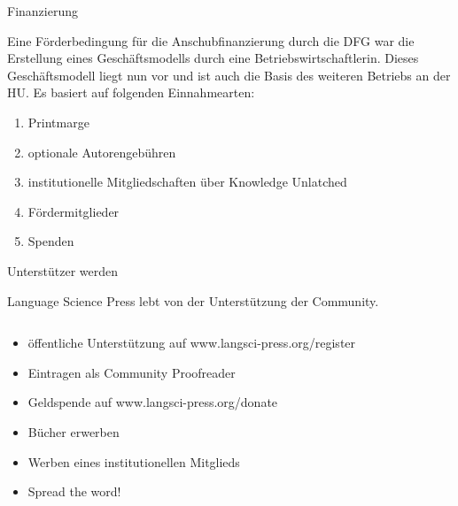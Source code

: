 \documentclass[final,utf8]{beamer}
\begin{document}
\begin{frame}{}
\begin{columns}[t]
\begin{column}{.45\linewidth}
    
    \begin{block}{Finanzierung} 
	\parbox{.9\textwidth}{
Eine F\"orderbedingung f\"ur die Anschubfinanzierung durch die DFG war die Erstellung eines Gesch\"aftsmodells durch eine Betriebswirtschaftlerin. Dieses Gesch\"aftsmodell liegt nun vor und ist auch die Basis des weiteren Betriebs an der HU. Es basiert auf folgenden Einnahmearten:
	\begin{enumerate} 
	    \item Printmarge
	    \item optionale Autorengeb\"uhren
	    \item institutionelle Mitgliedschaften \"uber Knowledge Unlatched
	    \item F\"ordermitglieder
	    \item Spenden
	\end{enumerate}  
}
    \end{block} 



    \begin{block}{Unterst\"utzer werden}

Language Science Press lebt von der Unterst\"utzung der Community. 
      \begin{columns}

	\begin{column}{.65\textwidth}
\begin{itemize}
 \item \"offentliche Unterst\"utzung auf www.langsci-press.org/register
 \item Eintragen als Community Proofreader 
 \item Geldspende auf www.langsci-press.org/donate
 \item B\"ucher erwerben
 \item Werben eines institutionellen Mitglieds 
 \item Spread the word!
\end{itemize}


\end{column}
\end{columns}
\end{block}
\end{column}
\end{columns}
\end{frame}
\end{document}
